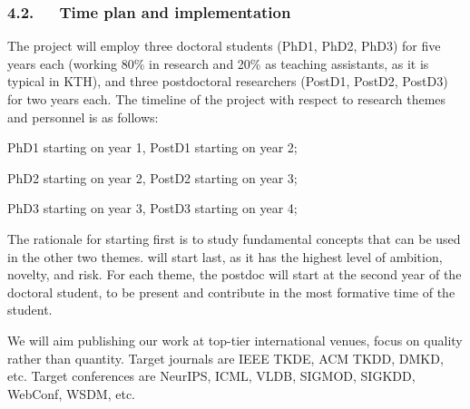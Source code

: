 \documentclass[a4paper,11pt]{article}
\begin{document}
\vspace{-1mm}
\subsubsection*{4.2.~~~Time plan and implementation}
\vspace{-1mm}


The project will employ three doctoral students (PhD1, PhD2, PhD3) for five years each 
(working 80\% in research and 20\% as teaching assistants, as it is typical in KTH), 
and three postdoctoral researchers (PostD1, PostD2, PostD3) for two years each. 
%
The timeline of the project with respect to research themes and personnel is as follows:
\vspace{-2mm}
\begin{description}
\setlength{\itemsep}{-4pt}
\item[1.~~{\exploration}\,:] 
PhD1 starting on year 1, PostD1 starting on year 2;
\item[2.~~{\networks}\,:]
PhD2 starting on year 2, PostD2 starting on year 3;
\item[3.~~{\markets}\,:]
PhD3 starting on year 3, PostD3 starting on year 4;
\end{description}
\vspace{-2mm}
The rationale for \exploration starting first is to study 
fundamental concepts that can be used in the other two themes.
\markets will start last, as it has the highest level of ambition, novelty, and risk.
For each theme, the postdoc will start at the second year of the doctoral student, 
to be present and contribute in the most formative time of the student. 

We will aim publishing our work at top-tier international venues, 
focus on quality rather than quantity.
% 
Target journals 
are IEEE TKDE, ACM TKDD, DMKD, etc. 
Target conferences are NeurIPS, ICML, VLDB, SIGMOD, SIGKDD, WebConf, WSDM, etc.
\end{document}

